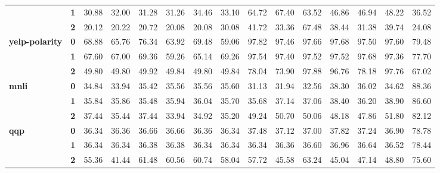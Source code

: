 \documentclass[11pt,a4paper]{article}
\begin{document}
\begin{table}[ht]
\begin{tabular}{llccccccccccccc}
		& \textbf{1} & 30.88      & 32.00      & 31.28      & 31.26      & 34.46      & 33.10      & 64.72       & 67.40       & 63.52      & 46.86        & 46.94        & 48.22        & 36.52      \\
		& \textbf{2} & 20.12      & 20.22      & 20.72      & 20.08      & 20.08      & 30.08      & 41.72       & 33.36       & 67.48      & 38.44        & 31.38        & 39.74        & 24.08      \\
		\hline
		\multirow{3}{*}{\textbf{yelp-polarity}} & \textbf{0} & 68.88      & 65.76      & 76.34      & 63.92      & 69.48      & 59.06      & 97.82       & 97.46       & 97.66      & 97.68        & 97.50        & 97.60        & 79.48      \\
		& \textbf{1} & 67.60      & 67.00      & 69.36      & 59.26      & 65.14      & 69.26      & 97.54       & 97.40       & 97.52      & 97.52        & 97.68        & 97.36        & 77.70      \\
		& \textbf{2} & 49.80      & 49.80      & 49.92      & 49.84      & 49.80      & 49.84      & 78.04       & 73.90       & 97.88      & 96.76        & 78.18        & 97.76        & 67.02      \\
		\hline
		\multirow{3}{*}{\textbf{mnli}}          & \textbf{0} & 34.84      & 33.94      & 35.42      & 35.56      & 35.56      & 35.60      & 31.13       & 31.94       & 32.56      & 38.30        & 36.02        & 34.62        & 88.36      \\
		& \textbf{1} & 35.84      & 35.86      & 35.48      & 35.94      & 36.04      & 35.70      & 35.68       & 37.14       & 37.06      & 38.40        & 36.20        & 38.90        & 86.60      \\
		& \textbf{2} & 37.44      & 35.44      & 37.44      & 33.94      & 34.92      & 35.20      & 49.24       & 50.70       & 50.06      & 48.18        & 47.86        & 51.80        & 82.12      \\
		\hline
		\multirow{3}{*}{\textbf{qqp}}           & \textbf{0} & 36.34      & 36.36      & 36.66      & 36.66      & 36.36      & 36.34      & 37.48       & 37.12       & 37.00      & 37.82        & 37.24        & 36.90        & 78.78      \\
		& \textbf{1} & 36.34      & 36.34      & 36.38      & 36.38      & 36.34      & 36.34      & 36.34       & 36.36       & 36.60      & 36.96        & 36.64        & 36.52        & 78.44      \\
		& \textbf{2} & 55.36      & 41.44      & 61.48      & 60.56      & 60.74      & 58.04      & 57.72       & 45.58       & 63.24      & 45.04        & 47.14        & 48.80        & 75.60      \\
		\bottomrule
	\end{tabular}



\end{table}
\end{document}
